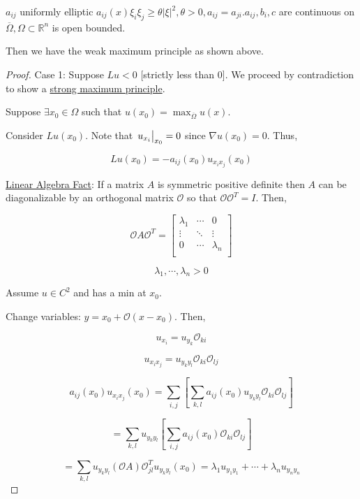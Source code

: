 \documentclass{article}
\theoremstyle{definition}
\begin{document}
\(a_{ij}\) uniformly elliptic \(a_{ij} (x) \xi_i \xi_j \geq \theta \vert \xi \vert ^ 2, \theta > 0, a_{ij} = a_{ji}. a_{ij}, b_i, c\) are continuous on \(\overline{\Omega}, \Omega \subset \mathbb{R}^n\) is open bounded.

Then we have the weak maximum principle as shown above. 

\begin{proof}
    Case 1: Suppose \(Lu < 0\) [strictly less than \(0\)]. We proceed by contradiction to show a \underline{strong maximum principle}.

    Suppose \(\exists x_0 \in \Omega\) such that \(u(x_0)=\max_{\overline{\Omega}} u(x)\).

    Consider \(Lu(x_0)\). Note that \(\eval{u_{x_i}}_{x_0} = 0\) since \(\nabla u(x_0)=0\). Thus,

    \[
        Lu(x_0) = -a_{ij}(x_0) u_{x_i x_j}(x_0)  
    \]

    \underline{Linear Algebra Fact}: If a matrix \(A\) is symmetric positive definite then \(A\) can be diagonalizable by an orthogonal matrix \(\mathcal{O}\) so that \(\mathcal{O} \mathcal{O}^T = I\). Then,
    
    \[
        \mathcal{O} A \mathcal{O}^T = \begin{bmatrix}
            \lambda_1 & \cdots &  0 \\
            \vdots & \ddots & \vdots  \\
            0 & \cdots &  \lambda_n \\
        \end{bmatrix}
    \]

    \[
        \lambda_1, \cdots , \lambda_n > 0
    \]

    Assume \(u\in C^2\) and has a min at \(x_0\).

    Change variables: \(y = x_0 + \mathcal{O} (x - x_0)\). Then,

    \[
        u_{x_i} = u_{y_k} \mathcal{O}_{ki}
    \]

    \[
        u_{x_i x_j} = u_{y_k y_l} \mathcal{O}_{ki} \mathcal{O}_{lj}
    \]

    \[
        a_{ij} (x_0) u_{x_i x_j}(x_0) = \sum_{i,j} \left[ \sum_{k,l} a_{ij} (x_0) u_{y_k y_l} \mathcal{O}_{ki} \mathcal{O}_{lj}  \right] 
    \]

    \[
        = \sum_{k,l} u_{y_k y_l} \left[ \sum_{i,j} a_{ij} (x_0) \mathcal{O}_{ki} \mathcal{O}_{lj} \right]
    \]

    \[
        = \sum_{k,l} u_{y_k y_l} (\mathcal{O} A) \mathcal{O}_{jl}^T u_{y_k y_l} (x_0) = \lambda_1 u_{y_1 y_1} + \cdots + \lambda_n u_{y_n y_n} 
    \]


\end{proof}
\end{document}
